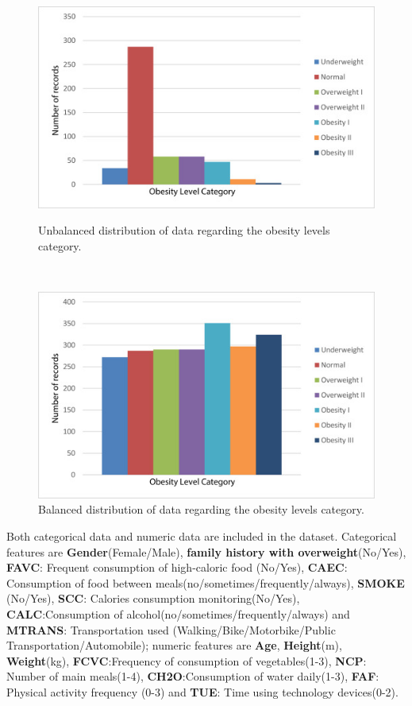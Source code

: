\begin{figure}[!htb]
\centering
   \begin{minipage}{0.9\textwidth}
     \centering
     \includegraphics[width=1\linewidth]{image/rawdata.jpg}
     \caption{Unbalanced distribution of data regarding the obesity levels category.\cite{palechor2019dataset}}\label{Fig:Data1}
   \end{minipage}\hfill
   \\
   \begin{minipage}{0.9\textwidth}
     \centering
     \includegraphics[width=1\linewidth]{image/balanced data.jpg}
     \caption{Balanced distribution of data regarding the obesity levels category.\cite{palechor2019dataset}}\label{Fig:Data2}
   \end{minipage}
\end{figure}

Both categorical data and numeric data are included in the dataset. Categorical features are \textbf{Gender}(Female/Male), \textbf{family history with overweight}(No/Yes), \textbf{FAVC}: Frequent consumption of high-caloric food (No/Yes), \textbf{CAEC}: Consumption of food between meals(no/sometimes/frequently/always), \textbf{SMOKE }(No/Yes),\textbf{ SCC}: Calories consumption monitoring(No/Yes), \textbf{CALC}:Consumption of alcohol(no/sometimes/frequently/always) and\textbf{ MTRANS}: Transportation used (Walking/Bike/Motorbike/Public Transportation/Automobile); numeric features are \textbf{Age}, \textbf{Height}(m), \textbf{Weight}(kg), \textbf{FCVC}:Frequency of consumption of vegetables(1-3),\textbf{ NCP}: Number of main meals(1-4), \textbf{CH2O}:Consumption of water daily(1-3), \textbf{FAF}: Physical activity frequency (0-3) and \textbf{TUE}: Time using technology devices(0-2).


